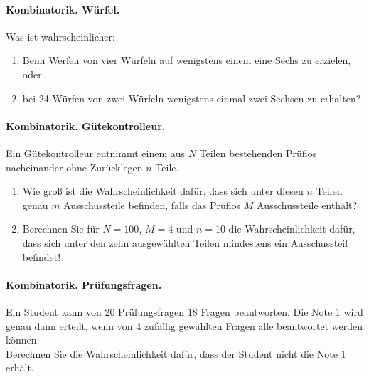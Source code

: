 \paragraph{Kombinatorik. Würfel.}
Was ist wahrscheinlicher:
\begin{enumerate}
    \item Beim Werfen von vier Würfeln auf wenigstens einem eine Sechs zu
        erzielen, oder
    \item bei 24 Würfen von zwei Würfeln wenigstens einmal zwei Sechsen zu
        erhalten?
\end{enumerate}


\paragraph{Kombinatorik. Gütekontrolleur.}
Ein Gütekontrolleur entnimmt einem aus $N$ Teilen bestehenden Prüflos
nacheinander ohne Zurücklegen $n$ Teile.
\begin{enumerate}
\item Wie groß ist die Wahrscheinlichkeit dafür, dass sich unter diesen $n$
Teilen genau $m$ Ausschussteile befinden, falls das Prüflos $M$ Ausschussteile
enthält?
\item Berechnen Sie für $N=100$, $M=4$ und $n=10$ die Wahrscheinlichkeit
dafür, dass sich unter den zehn ausgewählten Teilen mindestens ein
Ausschussteil
befindet!
\end{enumerate}


\paragraph{Kombinatorik. Prüfungsfragen.}
Ein Student kann von 20 Prüfungsfragen 18 Fragen beantworten. Die Note 1 wird
genau dann erteilt, wenn von 4 zufällig gewählten Fragen alle beantwortet
werden können. \\
Berechnen Sie die Wahrscheinlichkeit dafür, dass der Student nicht die Note 1
erhält.





